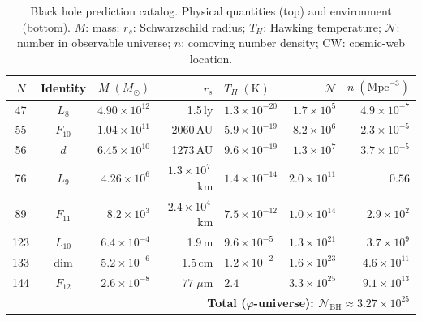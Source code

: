 \documentclass[12pt,a4paper]{article}
\begin{document}
\begin{table}[h!]
\centering\small
\caption{Black hole prediction catalog. Physical quantities (top) and environment (bottom). $M$: mass; $r_s$: Schwarzschild radius; $T_H$: Hawking temperature; $\mathcal{N}$: number in observable universe; $n$: comoving number density; CW: cosmic-web location.}
\label{tab:bh-master}
\begin{tabular}{cc rr l rr}
\toprule
$N$ & Identity & $M\;(M_\odot)$ & $r_s$ & $T_H\;(\mathrm{K})$ & $\mathcal{N}$ & $n\;(\mathrm{Mpc}^{-3})$ \\
\midrule
47 & $L_8$ & $4.90\times 10^{12}$ & 1.5\,ly & $1.3\times 10^{-20}$ & $1.7\times 10^{5}$ & $4.9\times 10^{-7}$ \\
55 & $F_{10}$ & $1.04\times 10^{11}$ & 2060\,AU & $5.9\times 10^{-19}$ & $8.2\times 10^{6}$ & $2.3\times 10^{-5}$ \\
56 & $d$ & $6.45\times 10^{10}$ & 1273\,AU & $9.6\times 10^{-19}$ & $1.3\times 10^{7}$ & $3.7\times 10^{-5}$ \\
76 & $L_9$ & $4.26\times 10^{6}$ & $1.3\times 10^{7}$\,km & $1.4\times 10^{-14}$ & $2.0\times 10^{11}$ & $0.56$ \\
89 & $F_{11}$ & $8.2\times 10^{3}$ & $2.4\times 10^{4}$\,km & $7.5\times 10^{-12}$ & $1.0\times 10^{14}$ & $2.9\times 10^{2}$ \\
123 & $L_{10}$ & $6.4\times 10^{-4}$ & 1.9\,m & $9.6\times 10^{-5}$ & $1.3\times 10^{21}$ & $3.7\times 10^{9}$ \\
133 & $\dim$ & $5.2\times 10^{-6}$ & 1.5\,cm & $1.2\times 10^{-2}$ & $1.6\times 10^{23}$ & $4.6\times 10^{11}$ \\
144 & $F_{12}$ & $2.6\times 10^{-8}$ & $77\;\mu$m & $2.4$ & $3.3\times 10^{25}$ & $9.1\times 10^{13}$ \\
\midrule
\multicolumn{7}{r}{\textbf{Total ($\varphi$-universe): $\mathcal{N}_{\mathrm{BH}} \approx 3.27 \times 10^{25}$}} \\
\bottomrule
\end{tabular}


\end{table}
\end{document}

